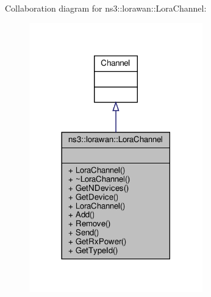 Collaboration diagram for ns3\+:\+:lorawan\+:\+:Lora\+Channel\+:
\nopagebreak
\begin{figure}[H]
\begin{center}
\leavevmode
\includegraphics[width=213pt]{classns3_1_1lorawan_1_1LoraChannel__coll__graph}
\end{center}
\end{figure}
